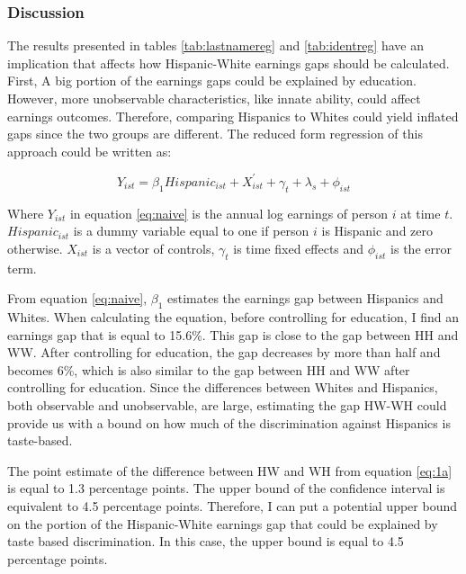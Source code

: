 \documentclass[12pt, fullpage]{article}
\begin{document}







\subsubsection{Discussion}
 
 The results presented in tables \ref{tab:lastnamereg} and \ref{tab:identreg} have an implication that affects how Hispanic-White earnings gaps should be calculated. First, A big portion of the earnings gaps could be explained by education. However, more unobservable characteristics, like innate ability, could affect earnings outcomes. Therefore, comparing Hispanics to Whites could yield inflated gaps since the two groups are different. The reduced form regression of this approach could be written as:
 
 \begin{equation} \label{eq:naive}
 Y_{ist} = \beta_{1} Hispanic_{ist} + X_{ist}^{\prime} + \gamma_{t} + \lambda_s + \phi_{ist}
 \end{equation}
 
Where $Y_{ist}$ in equation \ref{eq:naive} is the annual log earnings of person $i$ at time $t$. $Hispanic_{ist}$ is a dummy variable equal to one if person $i$ is Hispanic and zero otherwise. $X_{ist}$ is a vector of controls, $\gamma_{t}$ is time fixed effects and $\phi_{ist}$ is the error term.
 
From equation \ref{eq:naive}, $\beta_{1}$ estimates the earnings gap between Hispanics and Whites. When calculating the equation, before controlling for education, I find an earnings gap that is equal to 15.6\%. This gap is close to the gap between HH and WW. After controlling for education, the gap decreases by more than half and becomes 6\%, which is also similar to the gap between HH and WW after controlling for education. Since the differences between Whites and Hispanics, both observable and unobservable, are large, estimating the gap HW-WH could provide us with a bound on how much of the discrimination against Hispanics is taste-based. 
 
The point estimate of the difference between HW and WH from equation \ref{eq:1a} is equal to 1.3 percentage points. The upper bound of the confidence interval is equivalent to 4.5 percentage points. Therefore, I can put a potential upper bound on the portion of the Hispanic-White earnings gap that could be explained by taste based discrimination. In this case, the upper bound is equal to 4.5 percentage points.
\end{document}
